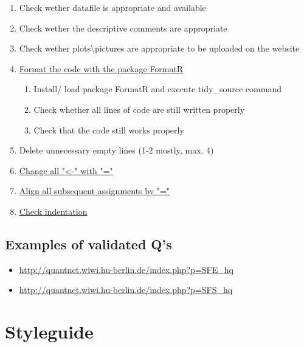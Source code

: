 \documentclass{article}
\begin{document}
\begin{enumerate}[label*=\arabic*.]
\begin {enumerate}[label*=\arabic*.]
		\item Check wether datafile is appropriate and available
		\item Check wether the descriptive comments are appropriate
		\item Check wether plots\textbackslash pictures are appropriate to be uploaded on the website
		\item \label{formatR-ini}\hyperref[formatR]{Format the code with the package FormatR}
			\begin{enumerate}[label*=\arabic*.]
				\item Install/ load package FormatR and execute tidy\_source command
				\item Check whether all lines of code are still written properly
				\item Check that the code still works 											properly	
			\end{enumerate}
		\item Delete unnecessary empty lines (1-2 mostly, max. 4)
		\item \label{all-equal-ini}\hyperref[all-equal]{Change all "\textless -" with "="}
		\item \label{align-assign-ini}\hyperref[align-assign]{Align all subsequent assignments by "="}
		\item \label{indentation-ini}\hyperref[indentation]{Check indentation}
	\end{enumerate}
\end{enumerate}

\subsection*{Examples of validated Q's}
\begin{itemize}
	\item \url{http://quantnet.wiwi.hu-berlin.de/index.php?p=SFE_hq}
	\item \url{http://quantnet.wiwi.hu-berlin.de/index.php?p=SFS_hq}
\end{itemize}

\section*{Styleguide}
\end{document}
